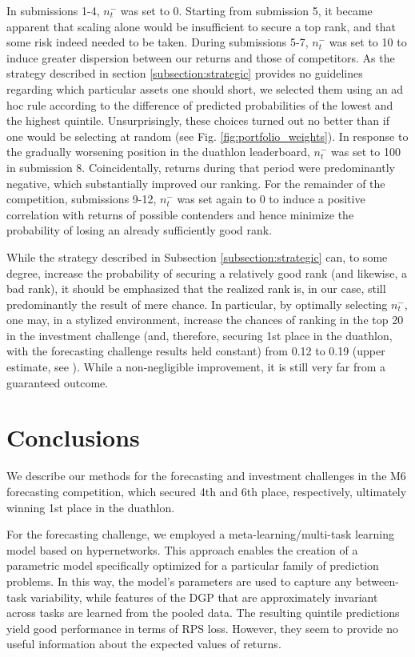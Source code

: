 \documentclass[3p,times,twocolumn]{elsarticle}
\begin{document}
In submissions 1-4, $n^{-}_{t}$ was set to 0.
Starting from submission 5, it became apparent that scaling alone would be insufficient to secure a top rank, and that some risk indeed needed to be taken.
During submissions 5-7, $n^{-}_{t}$ was set to 10 to induce greater dispersion between our returns and those of competitors.
As the strategy described in section \ref{subsection:strategic} provides no guidelines regarding which particular assets one should short, we selected them using an ad hoc rule according to the difference of predicted probabilities of the lowest and the highest quintile. 
Unsurprisingly, these choices turned out no better than if one would be selecting at random (see Fig. \ref{fig:portfolio_weights}).
In response to the gradually worsening position in the duathlon leaderboard, $n^{-}_{t}$ was set to 100 in submission 8.
Coincidentally, returns during that period were predominantly negative, which substantially improved our ranking.
For the remainder of the competition, submissions 9-12, $n^{-}_{t}$ was set again to 0 to induce a positive correlation with returns of possible contenders and hence minimize the probability of losing an already sufficiently good rank.

While the strategy described in Subsection \ref{subsection:strategic} can, to some degree, increase the probability of securing a relatively good rank (and likewise, a bad rank), it should be emphasized that the realized rank is, in our case, still predominantly the result of mere chance.
In particular, by optimally selecting $n^{-}_{t}$, one may, in a stylized environment, increase the chances of ranking in the top 20 in the investment challenge (and, therefore, securing 1st place in the duathlon, with the forecasting challenge results held constant) from 0.12 to 0.19 (upper estimate, see \citep{stanekNoteM6Forecasting2023a}). 
While a non-negligible improvement, it is still very far from a guaranteed outcome.

\section{Conclusions}\label{section:conclusions}

We describe our methods for the forecasting and investment challenges in the M6 forecasting competition, which secured 4th and 6th place, respectively, ultimately winning 1st place in the duathlon.

For the forecasting challenge, we employed a meta-learning/multi-task learning model based on hypernetworks.
This approach enables the creation of a parametric model specifically optimized for a particular family of prediction problems.
In this way, the model's parameters are used to capture any between-task variability, while features of the DGP that are approximately invariant across tasks are learned from the pooled data. 
The resulting quintile predictions yield good performance in terms of RPS loss. 
However, they seem to provide no useful information about the expected values of returns.
\end{document}
